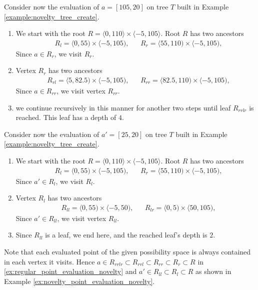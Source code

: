 \begin{example}
\label{ex:regular_point_evaluation_novelty}
    Consider now the evaluation of $a = [105,20]$ on tree $T$ built in Example \ref{example:novelty_tree_create}.

\begin{enumerate}
    \item  We start with the root $R = \langle 0,110\rangle \times \langle -5, 105 \rangle$.
    Root $R$ has two ancestors 
\begin{align*}
    &R_l = \langle 0,55) \times \langle -5, 105),&
    &R_r = \langle 55,110) \times \langle -5, 105),
\end{align*}
Since $a \in R_r$, we visit $R_r$.
\item Vertex $R_r$ has two ancestors
\begin{align*}
    &R_{rl} = \langle 5,82.5) \times \langle -5, 105),&
    &R_{rr} = \langle 82.5,110) \times \langle -5, 105),
\end{align*}
Since $a \in R_{rr}$, we visit vertex $R_{rr}$.
\item
we continue recursively in this manner for another two steps until leaf $R_{rrlr}$ is reached. This leaf has a depth of $4$.

\end{enumerate}
   
\end{example}

\begin{example}
\label{ex:novelty_point_evaluation_novelty}
    Consider now the evaluation of $a' = [25,20]$ on tree $T$ built in Example \ref{example:novelty_tree_create}.

\begin{enumerate}
    \item  We start with the root $R = \langle 0,110\rangle \times \langle -5, 105 \rangle$.
    Root $R$ has two ancestors 
\begin{align*}
    &R_l = \langle 0,55) \times \langle -5, 105),&
    &R_r = \langle 55,110) \times \langle -5, 105),
\end{align*}
Since $a' \in R_l$, we visit $R_l$.
\item Vertex $R_l$ has two ancestors
\begin{align*}
    &R_{ll} = \langle 0,55) \times \langle -5, 50),&
    &R_{lr} = \langle 0,5) \times \langle 50, 105),
\end{align*}
Since $a' \in R_{ll}$, we visit vertex $R_{ll}$.
\item
Since $R_{ll}$ is a leaf, we end here, and the reached leaf's depth is $2$.
\end{enumerate}
\end{example}
Note that each evaluated point of the given possibility space is always contained in each vertex it visits.
Hence $a \in R_{rrlr} \subset R_{rrl} \subset R_{rr} \subset R_{r} \subset R$ in \ref{ex:regular_point_evaluation_novelty}
and $a' \in R_{ll} \subset R_{l} \subset R$ as shown in Example \ref{ex:novelty_point_evaluation_novelty}.


